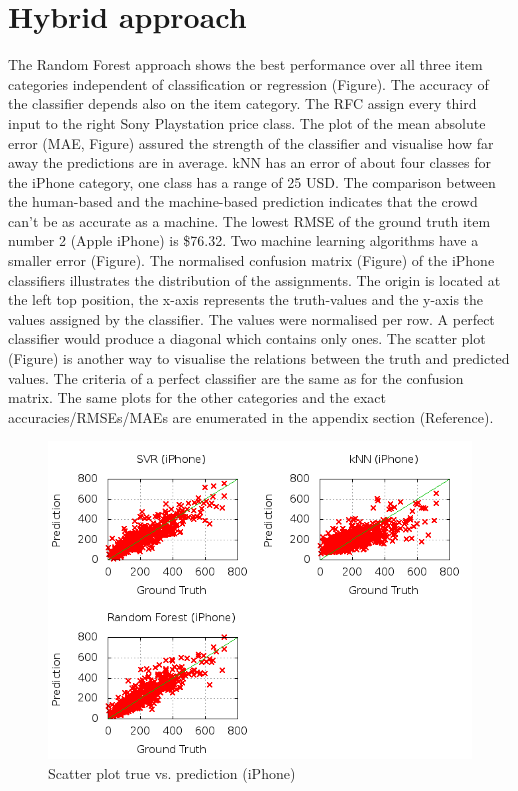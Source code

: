  

\section{Hybrid approach}
The Random Forest approach shows the best performance over all three item categories independent of classification or regression (Figure). The accuracy of the classifier depends also on the item category. The RFC assign every third input to the right Sony Playstation price class. The plot of the mean absolute error (MAE, Figure) assured the strength of the classifier and visualise how far away the predictions are in average. kNN has an error of about four classes for the iPhone category, one class has a range of 25 USD. The comparison between the human-based and the machine-based prediction indicates that the crowd can't be as accurate as a machine. The lowest RMSE of the ground truth item number 2 (Apple iPhone) is \$76.32. Two machine learning algorithms have a smaller error (Figure). 
The normalised confusion matrix (Figure) of the iPhone classifiers illustrates the distribution of the assignments. The origin is located at the left top position, the x-axis represents the truth-values and the y-axis the values assigned by the classifier. The values were normalised per row. A perfect classifier would produce a diagonal which contains only ones. 
The scatter plot (Figure) is another way to visualise the relations between the truth and predicted values. The criteria of a perfect classifier are the same as for the confusion matrix. 
The same plots for the other categories and the exact accuracies/RMSEs/MAEs are enumerated in the appendix section (Reference).
\begin{figure}
\centering
\includegraphics[scale=0.55]{images/plots/machine_learning/iphone/true_pred_iphone.png}
\caption{Scatter plot true vs. prediction (iPhone)}
\label{truth_predict_iphone}
\end{figure}
